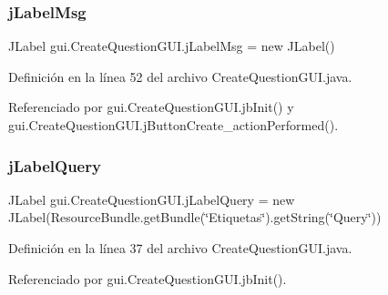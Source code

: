 \mbox{\label{classgui_1_1CreateQuestionGUI_ad0c2eb3eb7eefc996d684ddab25decf0}} 
\subsubsection{\texorpdfstring{jLabelMsg}{jLabelMsg}}
{\footnotesize\ttfamily J\+Label gui.\+Create\+Question\+G\+U\+I.\+j\+Label\+Msg = new J\+Label()\hspace{0.3cm}{\ttfamily [private]}}



Definición en la línea 52 del archivo Create\+Question\+G\+U\+I.\+java.



Referenciado por gui.\+Create\+Question\+G\+U\+I.\+jb\+Init() y gui.\+Create\+Question\+G\+U\+I.\+j\+Button\+Create\+\_\+action\+Performed().

\mbox{\label{classgui_1_1CreateQuestionGUI_a3a6aafbf3fb4ba909501668606612228}} 
\subsubsection{\texorpdfstring{jLabelQuery}{jLabelQuery}}
{\footnotesize\ttfamily J\+Label gui.\+Create\+Question\+G\+U\+I.\+j\+Label\+Query = new J\+Label(Resource\+Bundle.\+get\+Bundle(\char`\"{}Etiquetas\char`\"{}).get\+String(\char`\"{}Query\char`\"{}))\hspace{0.3cm}{\ttfamily [private]}}



Definición en la línea 37 del archivo Create\+Question\+G\+U\+I.\+java.



Referenciado por gui.\+Create\+Question\+G\+U\+I.\+jb\+Init().

\mbox{\label{classgui_1_1CreateQuestionGUI_a23aebdce43e2df93a150f96572dfb741}} 
